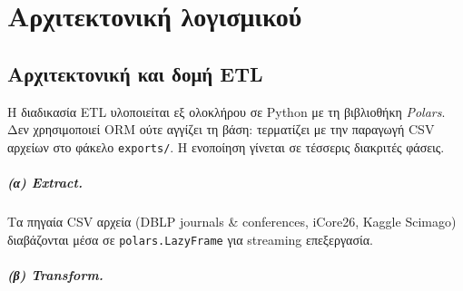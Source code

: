 \chapter{Αρχιτεκτονική λογισμικού}

\section{Αρχιτεκτονική και δομή ETL}

Η διαδικασία ETL υλοποιείται εξ ολοκλήρου σε Python με τη βιβλιοθήκη
\emph{Polars}. Δεν χρησιμοποιεί ORM ούτε αγγίζει τη βάση: τερματίζει με την
παραγωγή CSV αρχείων στο φάκελο \texttt{exports/}. Η ενοποίηση γίνεται σε
τέσσερις διακριτές φάσεις.

\paragraph{(α) Extract.} Τα πηγαία CSV αρχεία (DBLP journals \& conferences,
iCore26, Kaggle Scimago) διαβάζονται μέσα σε
\texttt{polars.LazyFrame} για streaming επεξεργασία.

\paragraph{(β) Transform.}

